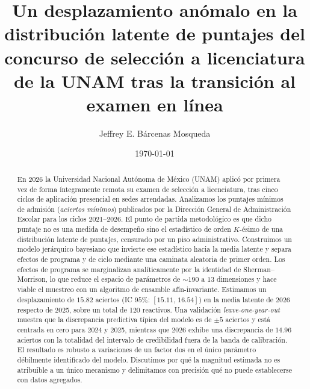 \documentclass[aps,prd,reprint,amsmath,amssymb,nofootinbib,superscriptaddress]{revtex4-2}
\renewcommand{\tablename}{Tabla}%
\begin{document}
\renewcommand{\tablename}{Tabla}

\title{Un desplazamiento an\'omalo en la distribuci\'on latente de puntajes
del concurso de selecci\'on a licenciatura de la UNAM tras la transici\'on
al examen en l\'inea}

\author{Jeffrey E. B\'arcenas Mosqueda}

\date{\today}

\begin{abstract}
En 2026 la Universidad Nacional Aut\'onoma de M\'exico (UNAM) aplic\'o por
primera vez de forma \'integramente remota su examen de selecci\'on a
licenciatura, tras cinco ciclos de aplicaci\'on presencial en sedes
arrendadas. Analizamos los puntajes m\'inimos de admisi\'on
(\emph{aciertos m\'inimos}) publicados por la Direcci\'on General de
Administraci\'on Escolar para los ciclos 2021--2026. El punto de partida
metodol\'ogico es que dicho puntaje no es una medida de desempe\~no sino el
estad\'istico de orden $K$-\'esimo de una distribuci\'on latente de
puntajes, censurado por un piso administrativo. Construimos un modelo
jer\'arquico bayesiano que invierte ese estad\'istico hacia la media
latente y separa efectos de programa y de ciclo mediante una caminata
aleatoria de primer orden. Los efectos de programa se marginalizan
anal\'iticamente por la identidad de Sherman--Morrison, lo que reduce el
espacio de par\'ametros de ${\sim}190$ a $13$ dimensiones y hace viable el
muestreo con un algoritmo de ensamble af\'in-invariante. Estimamos un
desplazamiento de $15.82$ aciertos (IC $95\%$: $[15.11,\,16.54]$) en la
media latente de 2026 respecto de 2025, sobre un total de 120 reactivos.
Una validaci\'on \emph{leave-one-year-out} muestra que la discrepancia
predictiva t\'ipica del modelo es de $\pm 5$ aciertos y est\'a centrada en
cero para 2024 y 2025, mientras que 2026 exhibe una discrepancia de
$14.96$ aciertos con la totalidad del intervalo de credibilidad fuera de
la banda de calibraci\'on. El resultado es robusto a variaciones de un
factor dos en el \'unico par\'ametro d\'ebilmente identificado del modelo.
Discutimos por qu\'e la magnitud estimada no es atribuible a un \'unico
mecanismo y delimitamos con precisi\'on qu\'e no puede establecerse con
datos agregados.
\end{abstract}

\maketitle
\end{document}
